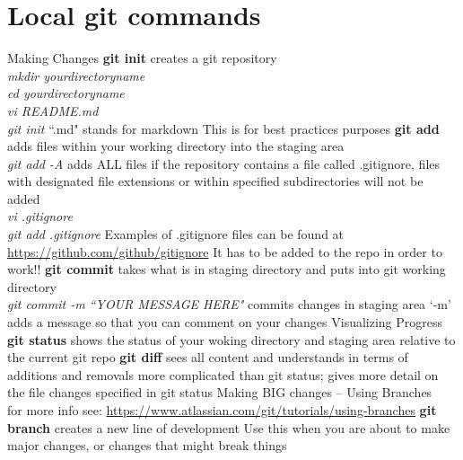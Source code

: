 \documentclass[12pt]{article}
\begin{document}
\clearpage
\section*{Local {\bf git} commands}

\begin{outline}[enumerate]
  \1 Making Changes  	
        \2 {\bf git init} 
       	 	\3 creates a git repository 
            		\\ {\it mkdir yourdirectoryname }
            		\\ {\it cd yourdirectoryname}
            		\\ {\it vi README.md}
		         \\ {\it git init}
                			\4 ``.md" stands for markdown
                			\4 This is for best practices purposes
        \2 {\bf git add}
        		\3 adds files within your working directory into the staging area
        		\\ {\it git add -A}
        			\4 adds ALL files
            	\3 if the repository contains a file called .gitignore, files with designated file extensions or within specified subdirectories will not be added
        		\\ {\it vi .gitignore}
        		\\ {\it git add .gitignore}
        			\4 Examples of .gitignore files can be found at \href{url}{https://github.com/github/gitignore}
        			\4 It has to be added to the repo in order to work!!
        \2 {\bf git commit}
            	\3 takes what is in staging directory and puts into git working directory
        		\\ {\it git commit -m ``YOUR MESSAGE HERE"}
        			\4 commits changes in staging area
        			\4 `-m' adds a message so that you can comment on your changes
\1 Visualizing Progress			
	\2 {\bf git status}
        		\3 shows the status of your woking directory and staging area relative to the current git repo
        \2 {\bf git diff}
        		\3 sees all content and understands in terms of additions and removals
            	\3 more complicated than git status; gives more detail on the file changes specified in git status
 \1 Making BIG changes -- Using Branches    
             	\\ for more info see: \href{url}{https://www.atlassian.com/git/tutorials/using-branches}   
        \2 {\bf git branch}
        		\3 creates a new line of development
        		\3 Use this when you are about to make major changes, or changes that might break things

\end{outline}
\end{document}
